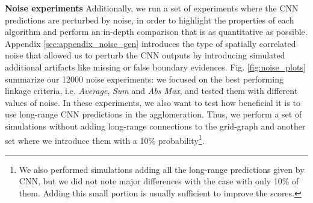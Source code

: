 

\textbf{Noise experiments }  Additionally, we run a set of experiments where the CNN predictions are perturbed by noise, in order to highlight the properties of each \algname{} algorithm and perform an in-depth comparison that is as quantitative as possible. Appendix \ref{sec:appendix_noise_gen} introduces the type of spatially correlated noise that allowed us to perturb the CNN outputs by introducing simulated additional artifacts like missing or false boundary evidences.  
Fig. \ref{fig:noise_plots} summarize our 12000 noise experiments: we focused on the best performing linkage criteria, i.e. \emph{Average}, \emph{Sum} and \emph{Abs Max}, and tested them with different values of noise. 
In these experiments, we also want to test how beneficial it is to use long-range CNN predictions in the agglomeration. Thus, we perform a set of simulations without adding long-range connections to the grid-graph and another set where we introduce them with a 10\% probability\footnote{We also performed simulations adding all the long-range predictions given by CNN, but we did not note major differences with the case with only 10\% of them. Adding this small portion is usually sufficient to improve the scores.}.

